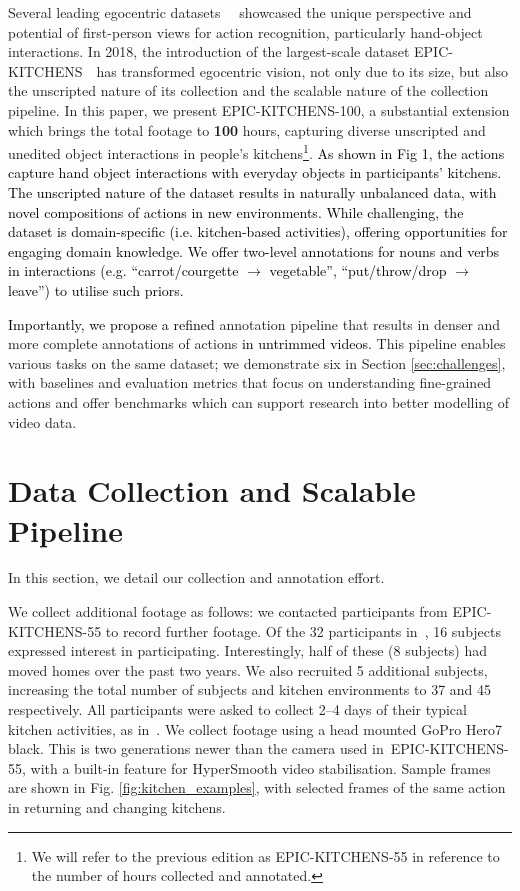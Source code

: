 \documentclass[twocolumn]{svjour3}          \smartqed
\newcommand{\chParagraph}[1]{\noindent {\textbf{#1.}} \hspace{6pt}}
\newcommand{\edits}[1]{\textcolor{black}{#1}}
\newcommand {\oldDataset} {EPIC-KITCHENS-55{}}
\newcommand {\newDataset} {EPIC-KITCHENS-100}
\begin{document}
Several leading egocentric datasets~~\cite{Pirsiavash2012,Damen2014a,Fathi2012,de2008guide,EGTEA} showcased the unique perspective and potential of first-person views for action recognition, particularly hand-object interactions.
In 2018, the introduction of the largest-scale dataset EPIC-KITCHENS~\cite{Damen2018EPICKITCHENS}\ has transformed egocentric vision, not only due to its size, but also the unscripted nature of its collection and the scalable nature of the collection pipeline.
In this paper, we present \newDataset, a substantial extension which brings the total footage to \textbf{100} hours, capturing diverse unscripted and unedited object interactions in people's kitchens\footnote{We will refer to the previous edition as EPIC-KITCHENS-55 in reference to the number of hours collected and annotated.}. 
\edits{As shown in Fig 1, the actions capture hand object interactions with everyday objects in participants' kitchens. The unscripted nature of the dataset results in naturally unbalanced data, with novel compositions of actions in new environments. While challenging, the dataset is domain-specific (i.e. kitchen-based activities), offering opportunities for engaging domain knowledge. We offer two-level annotations for nouns and verbs in interactions (e.g. ``carrot/courgette $\rightarrow$ vegetable'', ``put/throw/drop $\rightarrow$ leave'') to utilise such priors.}

\edits{Importantly, we propose a refined} annotation pipeline that results in denser and more complete annotations of actions \edits{in untrimmed videos.}
This pipeline enables various tasks on the same dataset; we demonstrate six in Section \ref{sec:challenges}, with baselines and evaluation metrics that
focus on understanding fine-grained actions and offer benchmarks which can support research into better modelling of video data.


\section{Data Collection and Scalable Pipeline}
\label{sec:data_collection_pipeline}
In this section, we detail our collection and annotation effort. 

\chParagraph{Data Collection}
We collect additional footage as follows:
we contacted participants from \oldDataset{} to record further footage.
Of the 32 participants in~\cite{Damen2018EPICKITCHENS}, 16 subjects expressed interest in participating. Interestingly, half of these (8 subjects) had moved homes over the past two years.
We also recruited 5 additional subjects, increasing the total number of subjects and kitchen environments to 37 and 45 respectively.
All participants were asked to collect 2--4 days of their typical kitchen activities, as in~\cite{Damen2018EPICKITCHENS}.
We collect footage using a head mounted GoPro Hero7 black. This is two generations newer than the camera used in~\oldDataset, with a built-in feature for HyperSmooth video stabilisation. 
Sample frames are shown in Fig. \ref{fig:kitchen_examples}, with selected frames of the same action in returning and changing kitchens.
\end{document}
